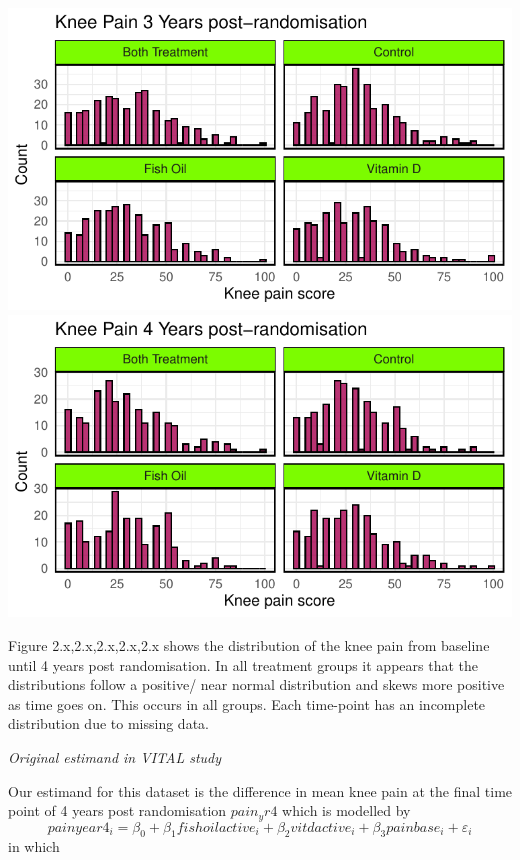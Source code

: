 \documentclass{article}
\begin{document}
\includegraphics{Final_Report_files/figure-latex/unnamed-chunk-7-4.pdf}
\includegraphics{Final_Report_files/figure-latex/unnamed-chunk-7-5.pdf}

Figure 2.x,2.x,2.x,2.x,2.x shows the distribution of the knee pain from
baseline until 4 years post randomisation. In all treatment groups it
appears that the distributions follow a positive/ near normal
distribution and skews more positive as time goes on. This occurs in all
groups. Each time-point has an incomplete distribution due to missing
data.

\emph{Original estimand in VITAL study}

Our estimand for this dataset is the difference in mean knee pain at the
final time point of 4 years post randomisation \(pain_yr4\) which is
modelled by
\[painyear4_i = \beta_0 + \beta_1 fishoilactive_i + \beta_2 vitdactive_i + \beta_3 painbase_i + \varepsilon_i\]
in which
\end{document}

